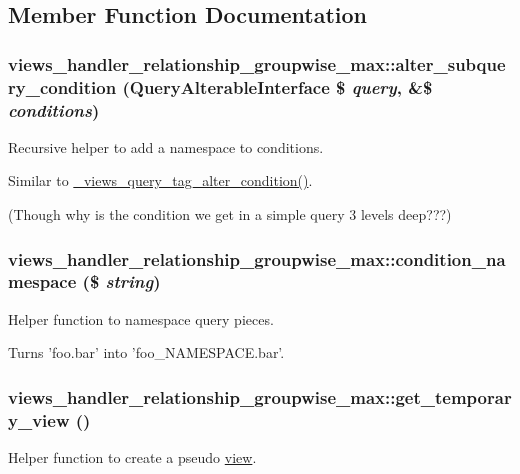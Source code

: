 \subsection{Member Function Documentation}
\hypertarget{classviews__handler__relationship__groupwise__max_a70411d08b3516619b376be6b3411d70c}{
\subsubsection[{alter\_\-subquery\_\-condition}]{\setlength{\rightskip}{0pt plus 5cm}views\_\-handler\_\-relationship\_\-groupwise\_\-max::alter\_\-subquery\_\-condition (QueryAlterableInterface \$ {\em query}, \/  \&\$ {\em conditions})}}
\label{classviews__handler__relationship__groupwise__max_a70411d08b3516619b376be6b3411d70c}
Recursive helper to add a namespace to conditions.

Similar to \hyperlink{views_8module_a51cb108c148c7478b50e6262e216a17d}{\_\-views\_\-query\_\-tag\_\-alter\_\-condition()}.

(Though why is the condition we get in a simple query 3 levels deep???) \hypertarget{classviews__handler__relationship__groupwise__max_af6f3f64602d39ea3f4620f06534c5779}{
\subsubsection[{condition\_\-namespace}]{\setlength{\rightskip}{0pt plus 5cm}views\_\-handler\_\-relationship\_\-groupwise\_\-max::condition\_\-namespace (\$ {\em string})}}
\label{classviews__handler__relationship__groupwise__max_af6f3f64602d39ea3f4620f06534c5779}
Helper function to namespace query pieces.

Turns 'foo.bar' into 'foo\_\-NAMESPACE.bar'. \hypertarget{classviews__handler__relationship__groupwise__max_a2af65fae1b0d97331ccf817be451399c}{
\subsubsection[{get\_\-temporary\_\-view}]{\setlength{\rightskip}{0pt plus 5cm}views\_\-handler\_\-relationship\_\-groupwise\_\-max::get\_\-temporary\_\-view ()}}
\label{classviews__handler__relationship__groupwise__max_a2af65fae1b0d97331ccf817be451399c}
Helper function to create a pseudo \hyperlink{classview}{view}.

